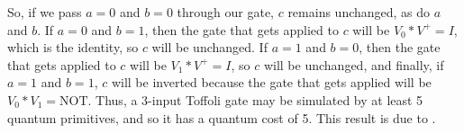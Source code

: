 So, if we pass $a=0$ and $b=0$ through our gate, $c$ remains unchanged, as do $a$ and $b$. If $a=0$ and $b=1$, then the gate that gets applied to $c$ will be $V_{0}*V^{+}=I$, which is the identity, so $c$ will be unchanged. If $a=1$ and $b=0$, then the gate that gets applied to $c$ will be $V_{1}*V^{+}=I$, so $c$ will be unchanged, and finally, if $a=1$ and $b=1$, $c$ will be inverted because the gate that gets applied will be $V_{0}*V_{1}=\text{NOT}$. Thus, a 3-input Toffoli gate may be simulated by at least 5 quantum primitives, and so it has a quantum cost of 5. This result is due to \cite{Smolin1994}.